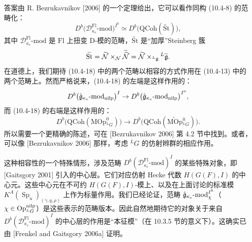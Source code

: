 答案由 R. Bezrukavnikov [2006] 的一个定理给出，它可以看作同构 (10.4-8) 的范畴化：
\begin{equation}
    D^b\bigl(\mathcal{D}^{\mathrm{Fl}}_{\kappa_c}\text{-}\mathrm{mod}\bigr)^{I^0}
    \simeq D^b\bigl(\mathrm{QCoh}(\widetilde{\mathrm{St}})\bigr),
    \tag{10.4-18}
\end{equation}
其中 $\mathcal{D}^{\mathrm{Fl}}_{\kappa_c}\text{-}\mathrm{mod}$ 是 $\mathrm{Fl}$ 上扭变 D-模的范畴，$\widetilde{\mathrm{St}}$ 是“加厚”Steinberg 簇
\[
    \widetilde{\mathrm{St}}
    =\widetilde{\mathcal{N}}\times_{\mathcal{N}}\widetilde{\widetilde{\mathcal{N}}}
    =\widetilde{\mathcal{N}}\times_{{}^L\mathfrak{g}}{}^L\widetilde{\mathfrak{g}}.
\]
在道德上，我们期待 (10.4-18) 中的两个范畴以相容的方式作用在 (10.4-13) 中的两个范畴上。然而严格说来，(10.4-18) 的左端是这样作用的：
\[
    D^b\bigl(\hat{\mathfrak{g}}_{\kappa_c}\text{-}\mathrm{mod}_{\mathrm{nilp}}\bigr)^I
    \to D^b\bigl(\hat{\mathfrak{g}}_{\kappa_c}\text{-}\mathrm{mod}_{\mathrm{nilp}}\bigr)^{I^0},
\]
而 (10.4-18) 的右端是这样作用的：
\[
    D^b\bigl(\mathrm{QCoh}(\mathrm{MOp}^0_{{}^L G})\bigr)
    \to D^b\bigl(\mathrm{QCoh}(\widetilde{\mathrm{MOp}}{}^0_{{}^L G})\bigr).
\]
所以需要一个更精确的陈述，可在 [Bezrukavnikov 2006] 第 4.2 节中找到。或者，可以像 [Bezrukavnikov 2006] 那样，考虑 ${}^L G$ 的仿射辫群的相应作用。

这种相容性的一个特殊情形，涉及范畴 $D^b(\mathcal{D}^{\mathrm{Fl}}_{\kappa_c}\text{-}\mathrm{mod})^I$ 的某些特殊对象，即 [Gaitsgory 2001] 引入的中心层。它们对应仿射 Hecke 代数 $H(G(F),I)$ 的中心元。这些中心元在不可约 $H(G(F),I)$-模上、以及在上面讨论的标准模 $K^A(\operatorname{Sp}_u)_{(\gamma,q,\rho)}$ 上作为标量作用。我们已经论证，范畴 $\hat{\mathfrak{g}}_{\kappa_c}\text{-}\mathrm{mod}_\chi^{I^0}$（$\chi\in\operatorname{Op}^{\mathrm{nilp}}_{{}^L G}$）是这些表示的范畴版本。因此自然地期待它的对象关于来自 $D^b(\mathcal{D}^{\mathrm{Fl}}_{\kappa_c}\text{-}\mathrm{mod})^I$ 的中心层的作用是“本征模”（在 10.3.5 节的意义下）。这确实已由 [Frenkel and Gaitsgory 2006a] 证明。

